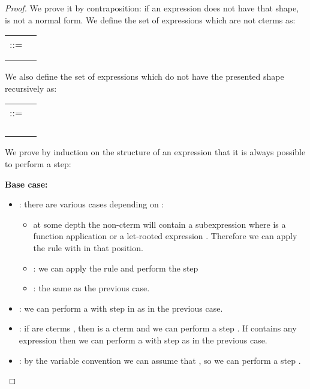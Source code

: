 \begin{proof}\label{DEMO_lemma:bigPeeling}
We prove it by contraposition: if an expression  does not have that shape,  is not a  normal form. We define the set of expressions which are not cterms as:

\begin{tabular}{ll@{}}
 ::=    &  \\
            &  \\
            &  \\
\end{tabular}

We also define the set of expressions which do not have the presented shape recursively as:

\begin{tabular}{ll}
 ::=    &  \\
            &  \\
            &  \\
            &  \\
            &  \\
\end{tabular}

We prove by induction on the structure of an expression  that it is always possible to perform a  step:

{\bf Base case:}
\begin{itemize}
\item : there are various cases depending on :
    \begin{itemize}
        \item at some depth the non-cterm will contain a subexpression  where  is a function application  or a let-rooted expression . Therefore we can apply the rule  with  in that position.
\item : we can apply the rule  and perform the step 
        \item : the same as the previous case.
    \end{itemize}
\item : we can perform a  with  step in  as in the previous  case.
\item : if  are cterms , then  is a cterm and we can perform a  step . If  contains any expression  then we can perform a  with  step as in the previous  case.
\item : by the variable convention we can assume that , so we can perform a  step .
\end{itemize}


\end{proof}
